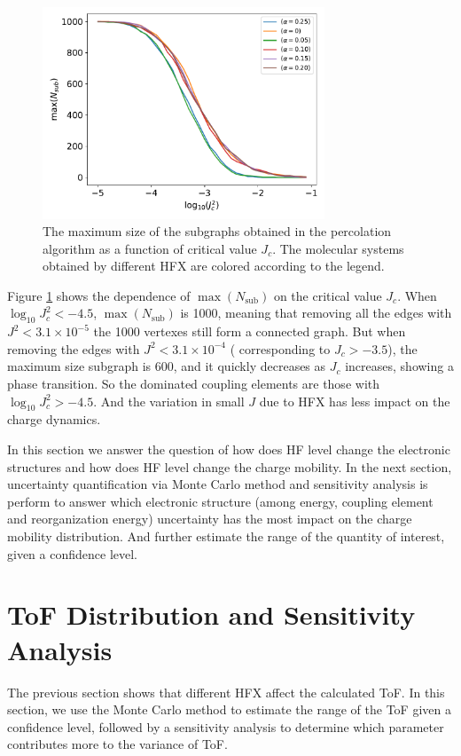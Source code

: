 \documentclass[letterpaper,12pt]{article}
\begin{document}
\begin{figure}[H]
    \centering
    \includegraphics[width=0.75\textwidth]{figs/MADN_HFX/fig_network_all.pdf}
    \caption{The maximum size of the subgraphs obtained in the percolation algorithm as a function of critical value $J_c$. The molecular systems obtained by different HFX are colored according to the legend.}
    \label{fig:J_percolate}
\end{figure}
Figure \ref{fig:J_percolate} shows the dependence of $\max({N_\text{sub}})$ on the critical value $J_c$. When $\log_{10} J_c^2 < -4.5$, $\max({N_\text{sub}})$ is 1000, meaning that removing all the edges with $J^2 < 3.1 \times 10^{-5}$ the 1000 vertexes still form a connected graph. 
But when removing the edges with $J^2 < 3.1 \times 10^{-4}$ ( corresponding to $J_c > -3.5$), the maximum size subgraph is 600, and it quickly decreases as $J_c$ increases, showing a phase transition. 
So the dominated coupling elements are those with $\log_{10} J_c^2 > -4.5$. 
And the variation in small $J$ due to HFX has less impact on the charge dynamics. 

In this section we answer the question of how does HF level change the electronic structures and 
how does HF level change the charge mobility. 
In the next section, uncertainty quantification via Monte Carlo method and sensitivity analysis is perform to answer which electronic structure (among energy, coupling element and reorganization energy) uncertainty has the most impact on the charge mobility distribution. 
And further estimate the range of the quantity of interest, given a confidence level.

\section{ToF Distribution and Sensitivity Analysis}
The previous section shows that different HFX affect the calculated ToF. In this section, we use the Monte Carlo method to estimate the range of the ToF given a confidence level, followed by a sensitivity analysis to determine which parameter contributes more to the variance of ToF. 
\end{document}
